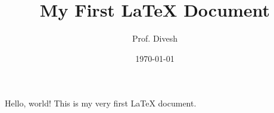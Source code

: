 \documentclass[12pt]{article} %
\title{My First \LaTeX{} Document} %
\author{Prof. Divesh}            %
\date{\today}                      %
\begin{document}

\maketitle                         %

Hello, world! This is my very first LaTeX document.
\end{document}
